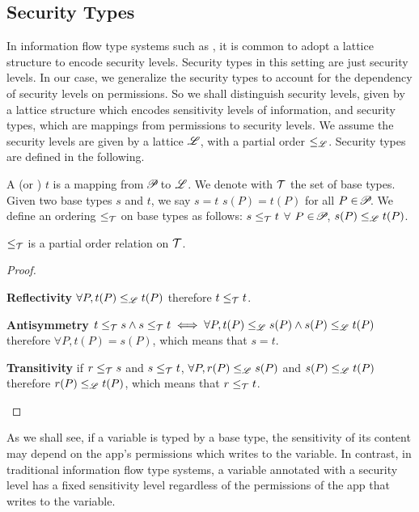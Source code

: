 { \subsection{Security Types}\label{sec:types}

In information flow type systems such as \cite{Volpano:1996}, it is common to adopt a lattice
structure to encode security levels. Security types in this setting are just security
levels. In our case, we generalize the security types to account for
the dependency of security levels on permissions. So we shall distinguish
security levels, given by a lattice structure which encodes sensitivity levels
of information, and security types, which are mappings from permissions to security levels.
We assume the security levels are given by a lattice $\mathscr{L}$, with a partial order $\leq_{\mathscr{L}}$.
Security types are defined in the following.

\begin{definition}\label{def:base_type}
A  (or ) $t$ is a mapping from $\!\mathscr{P}\!$ to $\mathscr{L}$.
We denote with $\mathcal{T}$ the set of base types.
Given two base types $s$ and $t$, we say $s=t$  $s(P)=t(P)$ for all  $P\in\!\mathscr{P}\!$.
We define an ordering $\leq_{\mathcal{T}}$ on base types as follows: 
$s\leq_{\mathcal{T}} t$  $\forall$ $P\in \!\mathscr{P}\!$, $s(P) \leq_{\mathscr{L}} t(P)$.
\end{definition}

\begin{lemma}\label{lem:tleq_po}
	$\leq_{\mathcal{T}}$ is a partial order relation on $\mathcal{T}$.
\end{lemma}
\begin{proof}
\begin{ProofEnumDesc}[style=standard]
	\item[\textbf{Reflectivity}] $\forall P, t(P)\leq_{\mathscr{L}} t(P)$ therefore $t\leq_{\mathcal{T}} t$.
	\item[\textbf{Antisymmetry}] $t\leq_{\mathcal{T}} s\wedge s\leq_{\mathcal{T}} t\iff \forall P, t(P)\leq_{\mathscr{L}} s(P)
\wedge s(P) \leq_{\mathscr{L}} t(P)$ therefore $\forall P, t(P)=s(P)$, which means that $s=t$.
	\item[\textbf{Transitivity}] if $r\leq_{\mathcal{T}} s$ and $s\leq_{\mathcal{T}} t$, $\forall P, r(P) \leq_{\mathscr{L}} s(P)$ and $s(P)\leq_{\mathscr{L}} t(P)$ therefore $r(P) \leq_{\mathscr{L}} t(P)$, which means that $r \leq_{\mathcal{T}} t$.
\end{ProofEnumDesc}
\end{proof}

As we shall see, if a variable is typed by a base type, the sensitivity of
its content may depend on the app's permissions which writes to the variable.
In contrast, in traditional information flow type systems,
a variable annotated with a security level has a fixed sensitivity level
regardless of the permissions of the app that writes to the variable.

}
